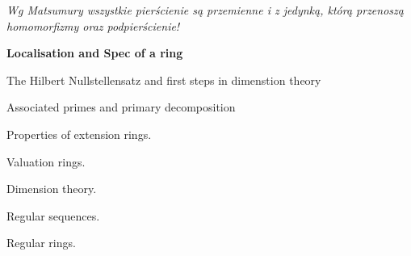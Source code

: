 

\renewcommand{\footrulewidth}{0.4pt}



\emph{Wg Matsumury wszystkie pierścienie są przemienne i z jedynką, którą przenoszą homomorfizmy oraz podpierścienie!}





\begin{enumx}
\item \textbf{ Localisation and Spec of a ring}
\item The Hilbert Nullstellensatz and first steps in dimenstion theory
\item Associated primes and primary decomposition
\end{enumx}

Properties  of extension rings.
\begin{enumx}
\item
\item
\item
\end{enumx}

Valuation  rings.
\begin{enumx}
\item
\item
\item
\end{enumx}

Dimension  theory.
\begin{enumx}
\item
\item
\item
\end{enumx}

Regular  sequences.
\begin{enumx}
\item
\item
\item
\end{enumx}

Regular  rings.
\begin{enumx}
\item
\item
\item
\end{enumx}

